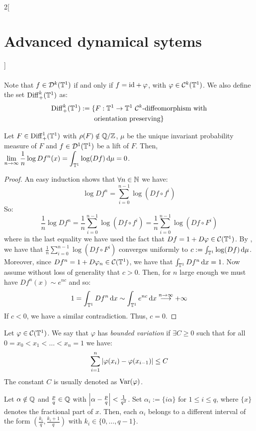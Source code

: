 \documentclass[../../../main_math.tex]{subfiles}
\begin{document}
\begin{multicols}{2}[\section{Advanced dynamical sytems}]
\begin{definition}
\begin{multline*}
    \end{multline*}
    Note that $f\in \mathcal{D}^k(\mathbb{T}^1)$ if and only if $f=\mathrm{id} +\varphi$, with $\varphi\in\mathcal{C}^k(\mathbb{T}^1)$.
    We also define the set $\mathrm{Diff}_+^k(\mathbb{T}^1)$ as:
    \begin{multline*}
      \mathrm{Diff}_+^k(\mathbb{T}^1):=\{F:\mathbb{T}^1\to\mathbb{T}^1 \text{ $\mathcal{C}^k$-diffeomorphism with}\\\text{orientation preserving}\}
    \end{multline*}
  \end{definition}
  \begin{proposition}
    Let $F\in\mathrm{Diff}_+^1(\mathbb{T}^1)$ with $\rho(F)\notin\quot{\QQ}{\ZZ}$, $\mu$ be the unique invariant probability measure of $F$ and $f\in\mathcal{D}^1(\mathbb{T}^1)$ be a lift of $F$. Then, $\displaystyle \lim_{n\to \infty}\frac{1}{n}\log Df^n(x)=\int_{\mathbb{T}^1}\log(Df)\dd{\mu}=0$.
  \end{proposition}
  \begin{proof}
    An easy induction shows that $\forall n\in\mathbb{N}$ we have:
    $$
      \log Df^n=\sum_{i=0}^{n-1}\log(Df\circ f^i)
    $$
    So:
    $$
      \frac{1}{n}\log Df^n=\frac{1}{n}\sum_{i=0}^{n-1}\log(Df\circ f^i)=\frac{1}{n}\sum_{i=0}^{n-1}\log(Df\circ F^i)
    $$
    where in the last equality we have used the fact that $Df=1+D\varphi\in \mathcal{C}(\mathbb{T}^1)$. By , we have that $\frac{1}{n}\sum_{i=0}^{n-1}\log(Df\circ F^i)$ converges uniformly to $c:=\int_{\mathbb{T}^1}\log(Df)\dd{\mu}$. Moreover, since $Df^n=1+D\varphi_n\in \mathcal{C}(\mathbb{T}^1)$, we have that $\int_{\mathbb{T}^1}Df^n\dd{x} =1$. Now assume without loss of generality that $c>0$. Then, for $n$ large enough we must have $Df^n(x)\sim e^{nc}$ and so:
    $$
      1=\int_{\mathbb{T}^1}Df^n\dd{x}\sim \int_{\mathbb{T}^1}e^{nc}\dd{x}\overset{n\to\infty}{\longrightarrow} +\infty
    $$
    If $c<0$, we have a similar contradiction. Thus, $c=0$.
  \end{proof}
  \begin{definition}
    Let $\varphi\in\mathcal{C}(\mathbb{T}^1)$. We say that $\varphi$ has \emph{bounded variation} if $\exists C\geq 0$ such that for all $0=x_0<x_1<\dots<x_n=1$ we have:
    $$
      \sum_{i=1}^n\abs{\varphi(x_i)-\varphi(x_{i-1})}\leq C
    $$
    The constant $C$ is usually denoted as $\mathrm{Var}(\varphi)$.
  \end{definition}
  \begin{lemma}\label{ADS:lema_alpha_i}
    Let $\alpha\notin\mathbb{Q}$ and $\frac{p}{q}\in \mathbb{Q}$ with $\abs{\alpha-\frac{p}{q}}<\frac{1}{q^2}$. Set $\alpha_i:=\{i\alpha\}$ for $1\leq i\leq q$, where $\{x\}$ denotes the fractional part of $x$. Then, each $\alpha_i$ belongs to a different interval of the form $\left(\frac{k_i}{q},\frac{k_i+1}{q}\right)$ with $k_i\in\{0,\ldots,q-1\}$.

\end{lemma}
\end{multicols}
\end{document}
